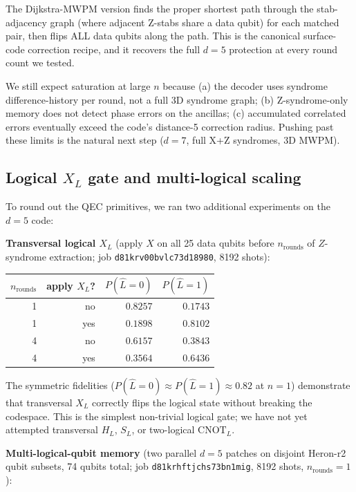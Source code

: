 \documentclass[11pt,letterpaper]{article}
\begin{document}
The Dijkstra-MWPM version finds the proper shortest path through the stab-adjacency graph (where adjacent Z-stabs share a data qubit) for each matched pair, then flips ALL data qubits along the path. This is the canonical surface-code correction recipe, and it recovers the full $d = 5$ protection at every round count we tested.

We still expect saturation at large $n$ because (a) the decoder uses syndrome difference-history per round, not a full 3D syndrome graph; (b) Z-syndrome-only memory does not detect phase errors on the ancillas; (c) accumulated correlated errors eventually exceed the code's distance-5 correction radius. Pushing past these limits is the natural next step ($d = 7$, full X+Z syndromes, 3D MWPM).

\subsection{Logical $X_L$ gate and multi-logical scaling}\label{ssec:logical_gates}

To round out the QEC primitives, we ran two additional experiments on the $d = 5$ code:

\textbf{Transversal logical $X_L$} (apply $X$ on all 25 data qubits before $n_{\mathrm{rounds}}$ of $Z$-syndrome extraction; job \texttt{d81krv00bvlc73d18980}, 8192 shots):
\begin{center}
\begin{tabular}{rrrr}
\toprule
$n_{\mathrm{rounds}}$ & apply $X_L$? & $P(\hat L = 0)$ & $P(\hat L = 1)$ \\
\midrule
1 & no  & $\bm{0.8257}$ & $0.1743$ \\
1 & yes & $0.1898$ & $\bm{0.8102}$ \\
4 & no  & $\bm{0.6157}$ & $0.3843$ \\
4 & yes & $0.3564$ & $\bm{0.6436}$ \\
\bottomrule
\end{tabular}
\end{center}

The symmetric fidelities ($P(\hat L = 0) \approx P(\hat L = 1) \approx 0.82$ at $n = 1$) demonstrate that transversal $X_L$ correctly flips the logical state without breaking the codespace. This is the simplest non-trivial logical gate; we have not yet attempted transversal $H_L$, $S_L$, or two-logical $\mathrm{CNOT}_L$.

\textbf{Multi-logical-qubit memory} (two parallel $d = 5$ patches on disjoint Heron-r2 qubit subsets, 74 qubits total; job \texttt{d81krhftjchs73bn1mig}, 8192 shots, $n_{\mathrm{rounds}} = 1$):
\end{document}
